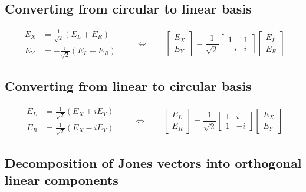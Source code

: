 \documentclass{book}
\begin{document}
\subsection{Converting from circular to linear basis}

\begin{equation}
    \begin{aligned}
        E_X &=  \frac{1}{\sqrt{2}}(E_L + E_R) \\
        E_Y &= -\frac{i}{\sqrt{2}}(E_L - E_R)
    \end{aligned}
    \qquad\Leftrightarrow\qquad
    \begin{bmatrix} E_X \\ E_Y \end{bmatrix}
        = \frac{1}{\sqrt{2}}
          \begin{bmatrix} 1 & 1 \\ -i & i \end{bmatrix}
          \begin{bmatrix} E_L \\ E_R \end{bmatrix}
\end{equation}

\subsection{Converting from linear to circular basis}

\begin{equation}
    \begin{aligned}
        E_L &= \frac{1}{\sqrt{2}}(E_X + iE_Y) \\
        E_R &= \frac{1}{\sqrt{2}}(E_X - iE_Y)
    \end{aligned}
    \qquad\Leftrightarrow\qquad
    \begin{bmatrix} E_L \\ E_R \end{bmatrix}
        = \frac{1}{\sqrt{2}}
          \begin{bmatrix} 1 & i \\ 1 & -i \end{bmatrix}
          \begin{bmatrix} E_X \\ E_Y \end{bmatrix}
\end{equation}

\subsection{Decomposition of Jones vectors into orthogonal linear components}
\end{document}
